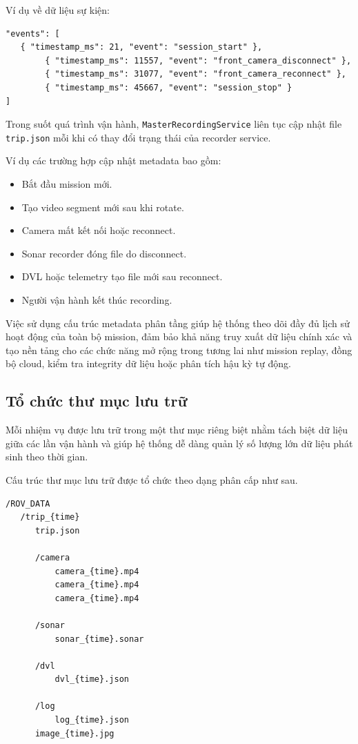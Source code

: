 \documentclass[../DoAn.tex]{subfiles}
\begin{document}
Ví dụ về dữ liệu sự kiện:

\begin{verbatim}
"events": [
   { "timestamp_ms": 21, "event": "session_start" },
        { "timestamp_ms": 11557, "event": "front_camera_disconnect" },
        { "timestamp_ms": 31077, "event": "front_camera_reconnect" },
        { "timestamp_ms": 45667, "event": "session_stop" }
]
\end{verbatim}

Trong suốt quá trình vận hành, \texttt{MasterRecordingService} liên tục cập nhật file \texttt{trip.json} mỗi khi có thay đổi trạng thái của recorder service.

Ví dụ các trường hợp cập nhật metadata bao gồm:

\begin{itemize}
    \item Bắt đầu mission mới.
    \item Tạo video segment mới sau khi rotate.
    \item Camera mất kết nối hoặc reconnect.
    \item Sonar recorder đóng file do disconnect.
    \item DVL hoặc telemetry tạo file mới sau reconnect.
    \item Người vận hành kết thúc recording.
\end{itemize}

Việc sử dụng cấu trúc metadata phân tầng giúp hệ thống theo dõi đầy đủ lịch sử hoạt động của toàn bộ mission, đảm bảo khả năng truy xuất dữ liệu chính xác và tạo nền tảng cho các chức năng mở rộng trong tương lai như mission replay, đồng bộ cloud, kiểm tra integrity dữ liệu hoặc phân tích hậu kỳ tự động.
\subsection{Tổ chức thư mục lưu trữ}

Mỗi nhiệm vụ được lưu trữ trong một thư mục riêng biệt nhằm tách biệt dữ liệu giữa các lần vận hành và giúp hệ thống dễ dàng quản lý số lượng lớn dữ liệu phát sinh theo thời gian.

Cấu trúc thư mục lưu trữ được tổ chức theo dạng phân cấp như sau.

\begin{verbatim}
/ROV_DATA
   /trip_{time}
      trip.json

      /camera
          camera_{time}.mp4
          camera_{time}.mp4
          camera_{time}.mp4

      /sonar
          sonar_{time}.sonar

      /dvl
          dvl_{time}.json

      /log
          log_{time}.json
      image_{time}.jpg
\end{verbatim}
\end{document}
